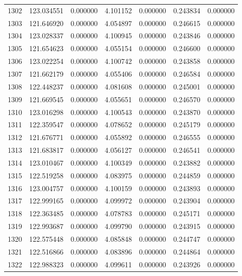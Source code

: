 \begin{tabular}{rrrrrrr}
1302 & 123.034551 &    0.000000 &  4.101152 &   0.000000 &   0.243834 &  0.000000 \\
1303 & 121.646920 &    0.000000 &  4.054897 &   0.000000 &   0.246615 &  0.000000 \\
1304 & 123.028337 &    0.000000 &  4.100945 &   0.000000 &   0.243846 &  0.000000 \\
1305 & 121.654623 &    0.000000 &  4.055154 &   0.000000 &   0.246600 &  0.000000 \\
1306 & 123.022254 &    0.000000 &  4.100742 &   0.000000 &   0.243858 &  0.000000 \\
1307 & 121.662179 &    0.000000 &  4.055406 &   0.000000 &   0.246584 &  0.000000 \\
1308 & 122.448237 &    0.000000 &  4.081608 &   0.000000 &   0.245001 &  0.000000 \\
1309 & 121.669545 &    0.000000 &  4.055651 &   0.000000 &   0.246570 &  0.000000 \\
1310 & 123.016298 &    0.000000 &  4.100543 &   0.000000 &   0.243870 &  0.000000 \\
1311 & 122.359547 &    0.000000 &  4.078652 &   0.000000 &   0.245179 &  0.000000 \\
1312 & 121.676771 &    0.000000 &  4.055892 &   0.000000 &   0.246555 &  0.000000 \\
1313 & 121.683817 &    0.000000 &  4.056127 &   0.000000 &   0.246541 &  0.000000 \\
1314 & 123.010467 &    0.000000 &  4.100349 &   0.000000 &   0.243882 &  0.000000 \\
1315 & 122.519258 &    0.000000 &  4.083975 &   0.000000 &   0.244859 &  0.000000 \\
1316 & 123.004757 &    0.000000 &  4.100159 &   0.000000 &   0.243893 &  0.000000 \\
1317 & 122.999165 &    0.000000 &  4.099972 &   0.000000 &   0.243904 &  0.000000 \\
1318 & 122.363485 &    0.000000 &  4.078783 &   0.000000 &   0.245171 &  0.000000 \\
1319 & 122.993687 &    0.000000 &  4.099790 &   0.000000 &   0.243915 &  0.000000 \\
1320 & 122.575448 &    0.000000 &  4.085848 &   0.000000 &   0.244747 &  0.000000 \\
1321 & 122.516866 &    0.000000 &  4.083896 &   0.000000 &   0.244864 &  0.000000 \\
1322 & 122.988323 &    0.000000 &  4.099611 &   0.000000 &   0.243926 &  0.000000 \\

\end{tabular}
